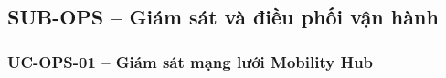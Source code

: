 \subsection{SUB-OPS -- Giám sát và điều phối vận hành}


\newcommand{\OPSDiagramFigure}[3]{%
  \begingroup
  \setlength{\intextsep}{0pt}
  \InsertArtifact[0.90\textheight]{#1}{#2}{#3}{}
  \endgroup
}

\subsubsection{UC-OPS-01 -- Giám sát mạng lưới Mobility Hub}


